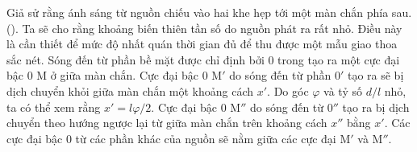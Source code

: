 Giả sử rằng ánh sáng từ nguồn chiếu vào hai khe hẹp tới một màn chắn phía sau. ().
Ta sẽ cho rằng khoảng biến thiên tần số do nguồn phát ra rất nhỏ.
Điều này là cần thiết để mức độ nhất quán thời gian đủ để thu được một mẫu giao thoa sắc nét.
Sóng đến từ phần bề mặt được chỉ định bởi $0$ trong  tạo ra một cực đại bậc 0 M ở giữa màn chắn.
Cực đại bậc 0 M$'$ do sóng đến từ phần $0'$ tạo ra sẽ bị dịch chuyển khỏi giữa màn chắn một khoảng cách $x'$.
Do góc $\varphi$ và tỷ số $d/l$ nhỏ, ta có thể xem rằng $x' = l\varphi/2$.
Cực đại bậc 0 M$''$ do sóng đến từ $0''$ tạo ra bị dịch chuyển theo hướng ngược lại từ giữa màn chắn trên khoảng cách $x''$ bằng $x'$.
Các cực đại bậc 0 từ các phần khác của nguồn sẽ nằm giữa các cực đại M$'$ và M$''$.

